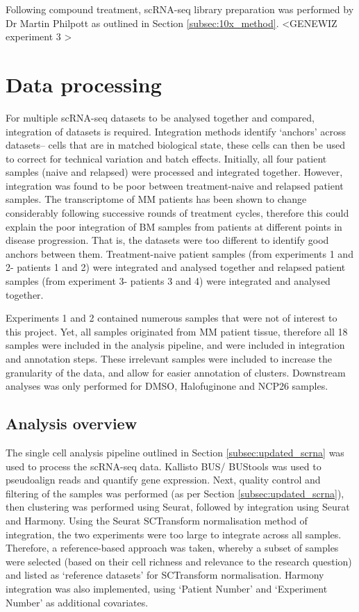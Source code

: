 Following compound treatment, scRNA-seq library preparation was performed by Dr Martin Philpott as outlined in Section \ref{subsec:10x_method}.
<GENEWIZ experiment 3 >


\section{Data processing}
For multiple scRNA-seq datasets to be analysed together and compared, integration of datasets is required.
Integration methods identify `anchors' across datasets-- cells that are in matched biological state, these cells can then be used to correct for technical variation and batch effects.
Initially, all four patient samples (naive and relapsed) were processed and integrated together.
However, integration was found to be poor between treatment-naive and relapsed patient samples.
The transcriptome of MM patients has been shown to change considerably following successive rounds of treatment cycles, therefore this could explain the poor integration of BM samples from patients at different points in disease progression.
That is, the datasets were too different to identify good anchors between them.
Treatment-naive patient samples (from experiments 1 and 2- patients 1 and 2) were integrated and analysed together and relapsed patient samples (from experiment 3- patients 3 and 4) were integrated and analysed together.

Experiments 1 and 2 contained numerous samples that were not of interest to this project.
Yet, all samples originated from MM patient tissue, therefore all 18 samples were included in the analysis pipeline, and were included in integration and annotation steps.
These irrelevant samples were included to increase the granularity of the data, and allow for easier annotation of clusters.
Downstream analyses was only performed for DMSO, Halofuginone and NCP26 samples.

\subsection{Analysis overview}

The single cell analysis pipeline outlined in Section \ref{subsec:updated_scrna} was used to process the scRNA-seq data.
Kallisto BUS/ BUStools was used to pseudoalign reads and quantify gene expression.
Next, quality control and filtering of the samples was performed (as per Section \ref{subsec:updated_scrna}), then clustering was performed using Seurat, followed by integration using Seurat and Harmony.
Using the Seurat SCTransform normalisation method of integration, the two experiments were too large to integrate across all samples.
Therefore, a reference-based approach was taken, whereby a subset of samples were selected (based on their cell richness and relevance to the research question) and listed as `reference datasets' for SCTransform normalisation.
Harmony integration was also implemented, using `Patient Number' and `Experiment Number' as additional covariates.

